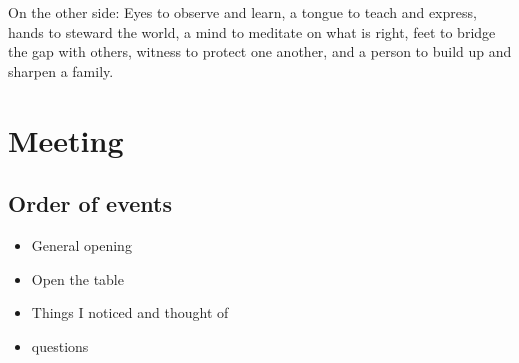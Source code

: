 On the other side: Eyes to observe and learn, a tongue to teach and express, hands to steward the world, a mind to meditate on what is right, feet to bridge the gap with others, witness to protect one another, and a person to build up and sharpen a family.

\section{Meeting}

\subsection{Order of events}

\begin{itemize}
\item General opening
\item Open the table
\item Things I noticed and thought of
\item questions
\end{itemize}

